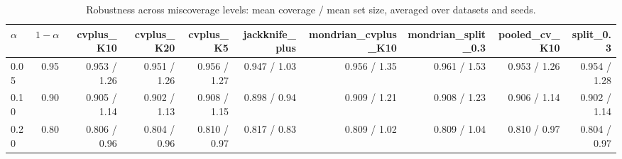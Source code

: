 \begin{table}[t]
\centering
\small
\caption{Robustness across miscoverage levels: mean coverage / mean set size, averaged over datasets and seeds.}
\label{tab:alpha}
\begin{tabular}{lrrrrrrrrr}
\toprule
$\alpha$ & $1-\alpha$ & cvplus\_K10 & cvplus\_K20 & cvplus\_K5 & jackknife\_plus & mondrian\_cvplus\_K10 & mondrian\_split\_0.3 & pooled\_cv\_K10 & split\_0.3 \\
\midrule
0.05 & 0.95 & 0.953 / 1.26 & 0.951 / 1.26 & 0.956 / 1.27 & 0.947 / 1.03 & 0.956 / 1.35 & 0.961 / 1.53 & 0.953 / 1.26 & 0.954 / 1.28 \\
0.10 & 0.90 & 0.905 / 1.14 & 0.902 / 1.13 & 0.908 / 1.15 & 0.898 / 0.94 & 0.909 / 1.21 & 0.908 / 1.23 & 0.906 / 1.14 & 0.902 / 1.14 \\
0.20 & 0.80 & 0.806 / 0.96 & 0.804 / 0.96 & 0.810 / 0.97 & 0.817 / 0.83 & 0.809 / 1.02 & 0.809 / 1.04 & 0.810 / 0.97 & 0.804 / 0.97 \\
\bottomrule
\end{tabular}
\end{table}

